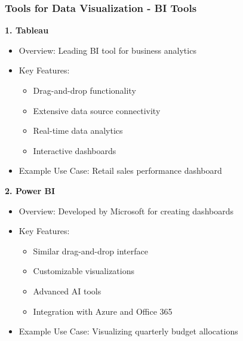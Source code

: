 \documentclass[aspectratio=169]{beamer}
\begin{document}
\begin{frame}[fragile]
    \frametitle{Tools for Data Visualization - BI Tools}
    \textbf{1. Tableau}
    \begin{itemize}
        \item Overview: Leading BI tool for business analytics
        \item Key Features:
            \begin{itemize}
                \item Drag-and-drop functionality
                \item Extensive data source connectivity
                \item Real-time data analytics
                \item Interactive dashboards
            \end{itemize}
        \item Example Use Case: Retail sales performance dashboard
    \end{itemize}

    \vspace{1em}
    
    \textbf{2. Power BI}
    \begin{itemize}
        \item Overview: Developed by Microsoft for creating dashboards
        \item Key Features:
            \begin{itemize}
                \item Similar drag-and-drop interface
                \item Customizable visualizations
                \item Advanced AI tools
                \item Integration with Azure and Office 365
            \end{itemize}
        \item Example Use Case: Visualizing quarterly budget allocations
    \end{itemize}
\end{frame}
\end{document}
